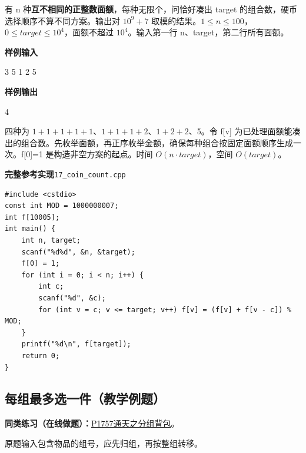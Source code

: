 \documentclass[UTF8,11pt,a4paper,fontset=none]{ctexart}
\newcommand{\practice}[2]{\par\noindent\textbf{同类练习（在线做题）：}\href{https://www.luogu.com.cn/problem/#1}{#1\quad #2}。\par}
\begin{document}
有 n 种\textbf{互不相同的正整数面额}，每种无限个，问恰好凑出 target 的组合数，硬币选择顺序不算不同方案。输出对 $10^9+7$ 取模的结果。$1\le n\le100$，$0\le target\le10^4$，面额不超过 $10^4$。输入第一行 n、target，第二行所有面额。
\begin{tcolorbox}[samplebox,title={输入输出样例}]
\textbf{样例输入}
\begin{Sample}
3 5
1 2 5
\end{Sample}
\tcblower
\textbf{样例输出}
\begin{Sample}
4
\end{Sample}
\end{tcolorbox}
四种为 $1+1+1+1+1$、$1+1+1+2$、$1+2+2$、5。令 f[v] 为已处理面额能凑出的组合数。先枚举面额，再正序枚举金额，确保每种组合按固定面额顺序生成一次。f[0]=1 是构造非空方案的起点。时间 $O(n\cdot target)$，空间 $O(target)$。
\par\noindent\begin{minipage}{\linewidth}
\textbf{完整参考实现}\quad\texttt{17\_coin\_count.cpp}
\begin{lstlisting}
#include <cstdio>
const int MOD = 1000000007;
int f[10005];
int main() {
    int n, target;
    scanf("%d%d", &n, &target);
    f[0] = 1;
    for (int i = 0; i < n; i++) {
        int c;
        scanf("%d", &c);
        for (int v = c; v <= target; v++) f[v] = (f[v] + f[v - c]) % MOD;
    }
    printf("%d\n", f[target]);
    return 0;
}
\end{lstlisting}
\end{minipage}\par

\subsection{每组最多选一件（教学例题）}

\practice{P1757}{通天之分组背包}
原题输入包含物品的组号，应先归组，再按整组转移。
\end{document}
